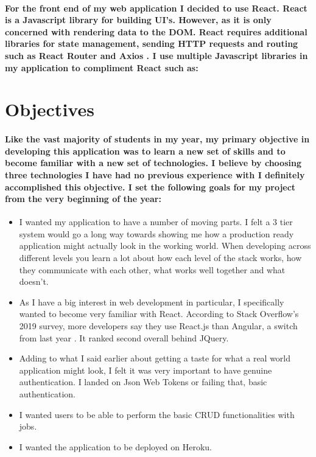 \paragraph{For the front end of my web application I decided to use React. React is a Javascript library for building UI's. However, as it is only concerned with rendering data to the DOM. React requires  additional libraries for state management, sending HTTP requests and routing such as React Router and Axios \cite{wiki:xxx}. I use multiple Javascript libraries in my application to compliment React such as: } 

\section{Objectives}
\paragraph{Like the vast majority of students in my year, my primary objective in developing this application was to learn a new set of skills and to become familiar with a new set of technologies. I believe by choosing three technologies I have had no previous experience with I definitely accomplished this objective. I set the following goals for my project from the very beginning of the year:}
\begin{itemize}
    \item I wanted my application to have a number of moving parts. I felt a 3 tier system would go a long way towards showing me how a production ready application might actually look in the working world. When developing across different levels you learn a lot about how each level of the stack works, how they communicate with each other, what works well together and what doesn't.
    \item As I have a big interest in web development in particular, I specifically wanted to become very familiar with React. According to Stack Overflow's 2019 survey, more developers say they use React.js than Angular, a switch from last year \cite{Stack}. It ranked second overall behind JQuery.
    \item Adding to what I said earlier about getting a taste for what a real world application might look, I felt it was very important to have genuine authentication. I landed on Json Web Tokens or failing that, basic authentication.
    \item I wanted users to be able to perform the basic CRUD functionalities with jobs.
    \item I wanted the application to be deployed on Heroku.

\end{itemize}


